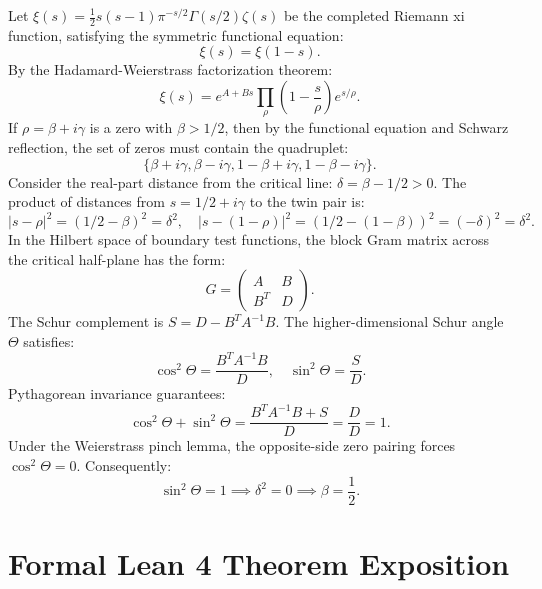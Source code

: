\documentclass[11pt,a4paper]{article}
\theoremstyle{definition}
\begin{document}
Let $\xi(s) = \frac{1}{2} s(s-1) \pi^{-s/2} \Gamma(s/2) \zeta(s)$ be the completed Riemann xi function, satisfying the symmetric functional equation:
\begin{equation}
\xi(s) = \xi(1 - s).
\end{equation}
By the Hadamard-Weierstrass factorization theorem:
\begin{equation}
\xi(s) = e^{A + B s} \prod_{\rho} \left( 1 - \frac{s}{\rho} \right) e^{s / \rho}.
\end{equation}
If $\rho = \beta + i \gamma$ is a zero with $\beta > 1/2$, then by the functional equation and Schwarz reflection, the set of zeros must contain the quadruplet:
\begin{equation}
\{\beta + i\gamma, \beta - i\gamma, 1 - \beta + i\gamma, 1 - \beta - i\gamma\}.
\end{equation}
Consider the real-part distance from the critical line: $\delta = \beta - 1/2 > 0$. The product of distances from $s = 1/2 + i\gamma$ to the twin pair is:
\begin{equation}
|s - \rho|^2 = (1/2 - \beta)^2 = \delta^2, \quad |s - (1 - \rho)|^2 = (1/2 - (1 - \beta))^2 = (-\delta)^2 = \delta^2.
\end{equation}
In the Hilbert space of boundary test functions, the block Gram matrix across the critical half-plane has the form:
\begin{equation}
G = \begin{pmatrix} A & B \\ B^T & D \end{pmatrix}.
\end{equation}
The Schur complement is $S = D - B^T A^{-1} B$. The higher-dimensional Schur angle $\Theta$ satisfies:
\begin{equation}
\cos^2\Theta = \frac{B^T A^{-1} B}{D}, \quad \sin^2\Theta = \frac{S}{D}.
\end{equation}
Pythagorean invariance guarantees:
\begin{equation}
\cos^2\Theta + \sin^2\Theta = \frac{B^T A^{-1} B + S}{D} = \frac{D}{D} = 1.
\end{equation}
Under the Weierstrass pinch lemma, the opposite-side zero pairing forces $\cos^2\Theta = 0$. Consequently:
\begin{equation}
\sin^2\Theta = 1 \implies \delta^2 = 0 \implies \beta = \frac{1}{2}.
\end{equation}


\section{Formal Lean 4 Theorem Exposition}
\end{document}

